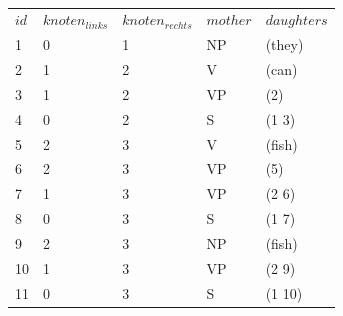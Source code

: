 \documentclass[12pt]{report}
\begin{document}
\begin{center}
\tt
\begin{tabular}{lllll}
$id$ & $knoten_{links}$ & $knoten_{rechts}$ & $mother$ & $daughters$ \\
1    & 0                & 1                 & NP       & (they)      \\
2    & 1                & 2                 & V        & (can)       \\
3    & 1                & 2                 & VP       & (2)         \\
4    & 0                & 2                 & S        & (1 3)       \\
5    & 2                & 3                 & V        & (fish)      \\
6    & 2                & 3                 & VP       & (5)         \\
7    & 1                & 3                 & VP       & (2 6)       \\
8    & 0                & 3                 & S        & (1 7)       \\
9    & 2                & 3                 & NP       & (fish)      \\
10   & 1                & 3                 & VP       & (2 9)       \\
11   & 0                & 3                 & S        & (1 10)     
\end{tabular}
\rm
{}
\end{center}
\end{document}
